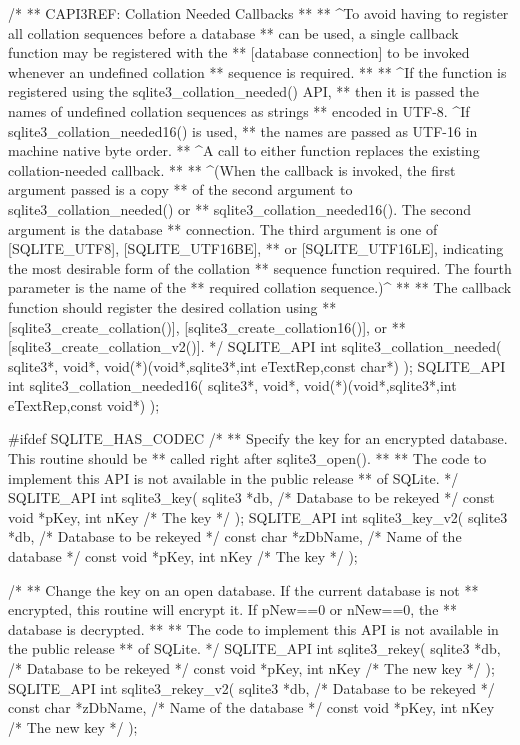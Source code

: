 \begin{Codex}[label=sqlite3.h,numbers=left]
{/*
** CAPI3REF: Collation Needed Callbacks
**
** ^To avoid having to register all collation sequences before a database
** can be used, a single callback function may be registered with the
** [database connection] to be invoked whenever an undefined collation
** sequence is required.
**
** ^If the function is registered using the sqlite3_collation_needed() API,
** then it is passed the names of undefined collation sequences as strings
** encoded in UTF-8. ^If sqlite3_collation_needed16() is used,
** the names are passed as UTF-16 in machine native byte order.
** ^A call to either function replaces the existing collation-needed callback.
**
** ^(When the callback is invoked, the first argument passed is a copy
** of the second argument to sqlite3_collation_needed() or
** sqlite3_collation_needed16().  The second argument is the database
** connection.  The third argument is one of [SQLITE_UTF8], [SQLITE_UTF16BE],
** or [SQLITE_UTF16LE], indicating the most desirable form of the collation
** sequence function required.  The fourth parameter is the name of the
** required collation sequence.)^
**
** The callback function should register the desired collation using
** [sqlite3_create_collation()], [sqlite3_create_collation16()], or
** [sqlite3_create_collation_v2()].
*/
SQLITE_API int sqlite3_collation_needed(
  sqlite3*, 
  void*, 
  void(*)(void*,sqlite3*,int eTextRep,const char*)
);
SQLITE_API int sqlite3_collation_needed16(
  sqlite3*, 
  void*,
  void(*)(void*,sqlite3*,int eTextRep,const void*)
);

#ifdef SQLITE_HAS_CODEC
/*
** Specify the key for an encrypted database.  This routine should be
** called right after sqlite3_open().
**
** The code to implement this API is not available in the public release
** of SQLite.
*/
SQLITE_API int sqlite3_key(
  sqlite3 *db,                   /* Database to be rekeyed */
  const void *pKey, int nKey     /* The key */
);
SQLITE_API int sqlite3_key_v2(
  sqlite3 *db,                   /* Database to be rekeyed */
  const char *zDbName,           /* Name of the database */
  const void *pKey, int nKey     /* The key */
);

/*
** Change the key on an open database.  If the current database is not
** encrypted, this routine will encrypt it.  If pNew==0 or nNew==0, the
** database is decrypted.
**
** The code to implement this API is not available in the public release
** of SQLite.
*/
SQLITE_API int sqlite3_rekey(
  sqlite3 *db,                   /* Database to be rekeyed */
  const void *pKey, int nKey     /* The new key */
);
SQLITE_API int sqlite3_rekey_v2(
  sqlite3 *db,                   /* Database to be rekeyed */
  const char *zDbName,           /* Name of the database */
  const void *pKey, int nKey     /* The new key */
);

}
\end{Codex}
